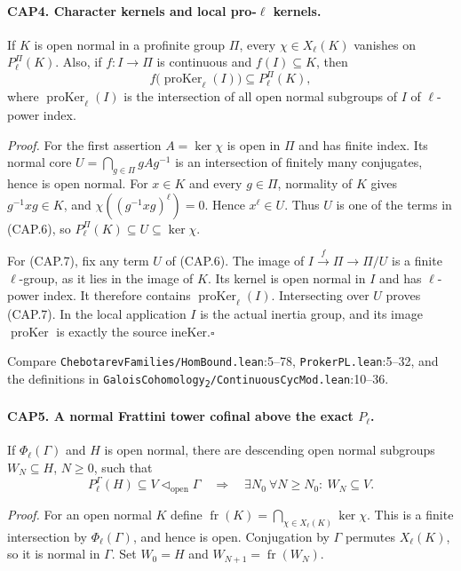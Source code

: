 \paragraph{CAP4. Character kernels and local pro-$\ell$ kernels.}
\label{claim:CAP4}
If $K$ is open normal in a profinite group $\Pi$, every
$\chi\in X_\ell(K)$ vanishes on $P_\ell^\Pi(K)$.  Also, if
$f:I\to\Pi$ is continuous and $f(I)\subseteq K$, then
\[
 f\bigl(\operatorname{proKer}_\ell(I)\bigr)
       \subseteq P_\ell^\Pi(K),
 \tag{CAP.7}
\]
where $\operatorname{proKer}_\ell(I)$ is the intersection of all open
normal subgroups of $I$ of $\ell$-power index.

\emph{Proof.}
For the first assertion $A=\ker\chi$ is open in $\Pi$ and has finite
index.  Its normal core $U=\bigcap_{g\in\Pi}gAg^{-1}$ is an intersection
of finitely many conjugates, hence is open normal.  For $x\in K$ and
every $g\in\Pi$, normality of $K$ gives $g^{-1}xg\in K$, and
$\chi((g^{-1}xg)^\ell)=0$.  Hence $x^\ell\in U$.
Thus $U$ is one of the terms in (CAP.6), so
$P_\ell^\Pi(K)\subseteq U\subseteq\ker\chi$.

For (CAP.7), fix any term $U$ of (CAP.6).  The image of
$I\xrightarrow{f}\Pi\to\Pi/U$ is a finite $\ell$-group, as it lies
in the image of $K$.  Its kernel is open normal in $I$ and has
$\ell$-power index.  It therefore contains
$\operatorname{proKer}_\ell(I)$.  Intersecting over $U$ proves (CAP.7).
In the local application $I$ is the actual inertia group, and its
image $\operatorname{proKer}$ is exactly the source
$\mathrm{ineKer}$.\hfill$\square$

Compare \nolinkurl{ChebotarevFamilies/HomBound.lean}:5--78,
\nolinkurl{ProkerPL.lean}:5--32, and the definitions in
\texttt{GaloisCohomology\textsubscript{2}/ContinuousCycMod.lean}:10--36.

\paragraph{CAP5. A normal Frattini tower cofinal above the exact $P_\ell$.}
\label{claim:CAP5}
If $\Phi_\ell(\Gamma)$ and $H$ is open normal, there are descending
open normal subgroups $W_N\subseteq H$, $N\geq0$, such that
\[
 P_\ell^\Gamma(H)\subseteq V\triangleleft_{\mathrm{open}}\Gamma
 \quad\Longrightarrow\quad
 \exists N_0\ \forall N\geq N_0:\ W_N\subseteq V.
 \tag{CAP.8}
\]

\emph{Proof.}
For an open normal $K$ define
$\operatorname{fr}(K)=\bigcap_{\chi\in X_\ell(K)}\ker\chi$.
This is a finite intersection by $\Phi_\ell(\Gamma)$, and hence is
open.  Conjugation by $\Gamma$ permutes $X_\ell(K)$, so it is normal
in $\Gamma$.  Set $W_0=H$ and $W_{N+1}=\operatorname{fr}(W_N)$.

